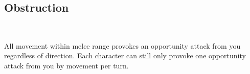 \subsection*{Obstruction}\label{feat:obstruction}
 \\

All movement within melee range provokes an opportunity attack from you
regardless of direction. Each character can still only provoke one opportunity
attack from you by movement per turn.


